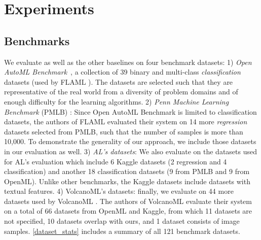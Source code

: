 \ncp\ncp\ncp
\section{Experiments}
\label{sec:eval}

\subsection{Benchmarks} 
We evaluate {\sysname} as well as the other baselines  on four  benchmark datasets: 1) \textit{Open AutoML Benchmark}~\cite{automl_benchmark}, a collection of 39 binary and multi-class \textit{classification} datasets (used by FLAML \cite{flaml}). The datasets are selected such that they are representative of the real world from a diversity of problem domains and of enough difficulty for the learning algorithms. 2) \textit{Penn Machine Learning Benchmark} (PMLB) \cite{pmlb}: Since Open AutoML Benchmark is limited to classification datasets, the authors of FLAML \cite{flaml} evaluated their system on 14 more \textit{regression} datasets selected from PMLB, such that the number of samples is more than 10,000. To demonstrate the generality of our approach, we include those datasets in our evaluation as well. 3) \textit{AL's datasets}: We also evaluate on the datasets used for AL's \cite{al} evaluation which include 6 Kaggle datasets (2 regression and 4 classification) and another 18  classification datasets (9 from PMLB and 9 from OpenML). Unlike other benchmarks, the Kaggle datasets include datasets with textual features. 
4) VolcanoML's datasets: finally, we evaluate {\sysname} on 44 more datasets used by VolcanoML \cite{VolcanoML}. The authors of VolcanoML evaluate their system on a total of 66 datasets from OpenML and Kaggle, from which 11 datasets are not specified, 10 datasets overlap with ours, and 1 dataset consists of image samples. 
\autoref{dataset_stats} includes a summary of all 121 benchmark datasets.



